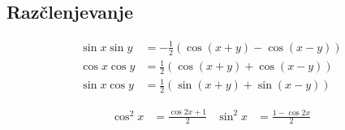 \documentclass[a4paper,oneside,10pt]{article}
\theoremstyle{definition}
\begin{document}
\begin{multicols}{2}
	\subsection*{Razčlenjevanje}
	\begin{align*}
		\sin{x}\sin{y} &= -\frac{1}{2}\left(\cos{(x+y)} - \cos{(x-y)} \right)\\
		\cos{x}\cos{y} &= \frac{1}{2}\left(\cos{(x+y)} + \cos{(x-y)} \right)\\
		\sin{x}\cos{y} &= \frac{1}{2}\left(\sin{(x+y)} + \sin{(x-y)} \right)
	\end{align*}

	\begin{align*}
		\cos^2{x} &= \frac{\cos{2x} + 1}{2} & \sin^2{x} &= \frac{1 - \cos{2x}}{2}
	\end{align*}	


\end{multicols}
\end{document}
